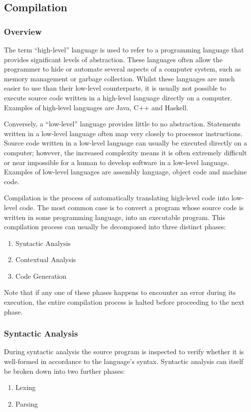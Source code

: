\documentclass{l4proj}
\begin{document}
\begin{appendices}
\chapter{Compilation}
\subsection{Overview}
The term ``high-level'' language is used to refer to a programming language that provides significant levels of abstraction. These languages often allow the programmer to hide or automate several aspects of a computer system, such as memory management or garbage collection. Whilst these languages are much easier to use than their low-level counterparts, it is usually not possible to execute source code written in a high-level language directly on a computer. Examples of high-level languages are Java, C++ and Haskell.

Conversely, a ``low-level'' language provides little to no abstraction. Statements written in a low-level language often map very closely to processor instructions. Source code written in a low-level language can usually be executed directly on a computer; however, the increased complexity means it is often extremely difficult or near impossible for a human to develop software in a low-level language. Examples of low-level languages are assembly language, object code and machine code.

Compilation is the process of automatically translating high-level code into low-level code. The most common case is to convert a program whose source code is written in some programming language, into an executable program. This compilation process can usually be decomposed into three distinct phases: 
\begin{enumerate}
\item Syntactic Analysis 
\item Contextual Analysis
\item Code Generation
\end{enumerate}
Note that if any one of these phases happens to encounter an error during its execution, the entire compilation process is halted before proceeding to the next phase.

\subsection{Syntactic Analysis}
During syntactic analysis the source program is inspected to verify whether it is well-formed in accordance to the language's syntax. Syntactic analysis can itself be broken down into two further phases:
\begin{enumerate}
\item Lexing
\item Parsing
\end{enumerate}


\end{appendices}
\end{document}
